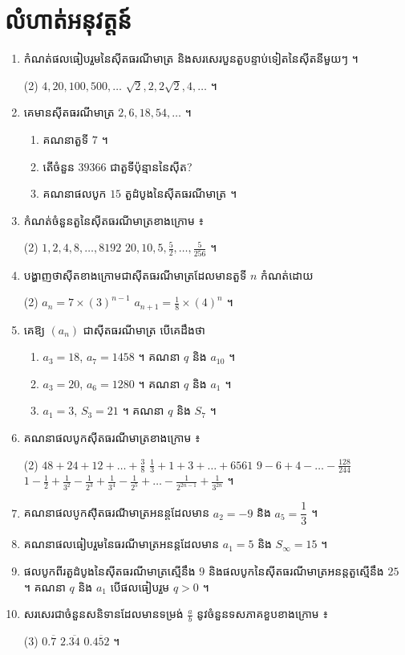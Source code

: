 \section*{លំហាត់អនុវត្តន៍}
\begin{enumerate}[1]
  \item កំណត់ផលធៀបរួមនៃស៊ីតធរណីមាត្រ និងសរសេរបួនតួបន្ទាប់ទៀតនៃស៊ីតនីមួយៗ ។
  \begin{tasks}(2)
    \task $4, 20, 100, 500, \ldots$
    \task $\sqrt{2}, 2, 2\sqrt{2}, 4, \ldots$ ។
  \end{tasks}
  \item គេមានស៊ីតធរណីមាត្រ $2, 6, 18, 54, \ldots$ ។
  \begin{enumerate}[a]
    \item គណនាតួទី $7$ ។
    \item តើចំនួន $39366$ ជាតួទីប៉ុន្មាននៃស៊ីត?
    \item គណនាផលបូក $15$ តួដំបូងនៃស៊ីតធរណីមាត្រ ។
  \end{enumerate}
  \item កំណត់ចំនួនតួនៃស៊ីតធរណីមាត្រខាងក្រោម ៖
  \begin{tasks}(2)
    \task $1, 2, 4, 8, \ldots, 8192$
    \task $20, 10, 5, \frac{5}{2}, \ldots, \frac{5}{256}$ ។
  \end{tasks}
  \item បង្ហាញថាស៊ីតខាងក្រោមជាស៊ីតធរណីមាត្រដែលមានតួទី $n$ កំណត់ដោយ
  \begin{tasks}(2)
    \task $a_n = 7 \times (3)^{n-1}$
    \task $a_{n+1} = \frac{1}{8} \times (4)^n$ ។
  \end{tasks}
  \item គេឱ្យ $(a_n)$ ជាស៊ីតធរណីមាត្រ បើគេដឹងថា
  \begin{enumerate}[a]
    \item $a_3 = 18$, $a_7 = 1458$ ។ គណនា $q$ និង $a_{10}$ ។
    \item $a_3 = 20$, $a_6 = 1280$ ។ គណនា $q$ និង $a_1$ ។
    \item $a_1 = 3$, $S_3 = 21$ ។ គណនា $q$ និង $S_7$ ។
  \end{enumerate}
  \item គណនាផលបូកស៊ីតធរណីមាត្រខាងក្រោម ៖
  \begin{tasks}(2)
    \task $48 + 24 + 12 + \ldots + \frac{3}{8}$
    \task $\frac{1}{3} + 1 + 3 + \ldots + 6561$
    \task $9 - 6 + 4 - \ldots - \frac{128}{244}$
    \task $1 - \frac{1}{2} + \frac{1}{3^2} - \frac{1}{2^3} + \frac{1}{3^4} - \frac{1}{2^5} + \ldots - \frac{1}{2^{2n-1}} + \frac{1}{3^{2n}}$ ។
  \end{tasks}
  \item គណនាផលបូកស៊ីតធរណីមាត្រអនន្តដែលមាន $a_2 = -9$ និង $a_5 = \dfrac{1}{3}$ ។
  \item គណនាផលធៀបរួមនៃធរណីមាត្រអនន្តដែលមាន $a_1 = 5$ និង $S_\infty = 15$ ។
  \item ផលបូកពីរតួដំបូងនៃស៊ីតធរណីមាត្រស្មើនឹង $9$ និងផលបូកនៃស៊ីតធរណីមាត្រអនន្តតួស្មើនឹង $25$ ។ គណនា $q$ និង $a_1$ បើផលធៀបរួម $q > 0$ ។
  \item សរសេរជាចំនួនសនិទានដែលមានទម្រង់ $\frac{a}{b}$ នូវចំនួនទសភាគខួបខាងក្រោម ៖
  \begin{tasks}(3)
    \task $0.\overline{7}$
    \task $2.\overline{34}$
    \task $0.\overline{452}$ ។
  \end{tasks}
\end{enumerate}

